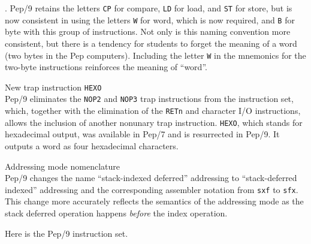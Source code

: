 \documentclass[10pt,fleqn]{book}
\newenvironment{exercises}
   {\begin{list}
      {\arabic{ecounter}.}
      {
         \usecounter{ecounter}
         \setcounter {ecounter}{0}
         \setlength\leftmargin{2pc}
         \setlength\labelwidth{6pc}
         \setlength\labelsep{1pc}
      }}
   {\end{list}}
\newcounter{ecounter}
\begin{document}
\begin{exercises}
Pep/9 retains the letters \verb|CP| for compare, \verb|LD| for load, and \verb|ST| for store, but is now consistent in using the letters \verb|W| for word, which is now required, and \verb|B| for byte with this group of instructions.
Not only is this naming convention more consistent, but there is a tendency for students to forget the meaning of a word (two bytes in the Pep computers).
Including the letter \verb|W| in the mnemonics for the two-byte instructions reinforces the meaning of ``word''.

\item New trap instruction \verb|HEXO|\\[6pt]
Pep/9 eliminates the \verb|NOP2| and \verb|NOP3| trap instructions from the instruction set, which, together with the elimination of the \verb|RETn| and character I/O instructions, allows the inclusion of another nonunary trap instruction.
\verb|HEXO|, which stands for hexadecimal output, was available in Pep/7 and is resurrected in Pep/9.
It outputs a word as four hexadecimal characters.

\item Addressing mode nomenclature\\[6pt]
Pep/9 changes the name ``stack-indexed deferred'' addressing to ``stack-deferred indexed'' addressing and the corresponding assembler notation from \verb|sxf| to \verb|sfx|.
This change more accurately reflects the semantics of the addressing mode as the stack deferred operation happens \textit{before} the index operation.

\end{exercises}

\newpage

\noindent Here is the Pep/9 instruction set.\\
\end{document}
